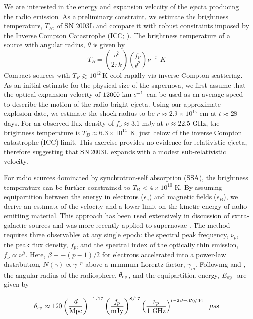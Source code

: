 \documentclass[12pt,preprint]{aastex}
\begin{document}
We are interested in the energy and expansion velocity of the ejecta
producing the radio emission.  As a preliminary constraint, we
estimate the brightness temperature, $T_B$, of SN 2003L and compare it
with robust constraints imposed by the Inverse Compton Catastrophe
(ICC; \citealt{kp81}).  The brightness temperature of a source with
angular radius, $\theta$ is given by
%
\begin{equation}
T_B = \left( \frac{c^2}{2\pi k}\right) \left( \frac {f_{\nu}}{\theta^2}\right) \nu^{-2}~~K
\end{equation}
%
Compact sources with $T_B \gtrsim 10^{12}\,$K cool rapidly via inverse
Compton scattering.  As an initial estimate for the physical size of
the supernova, we first assume that the optical expansion velocity of
$12000\rm ~km~s^{-1}$ \citep{mck+03} can be used as an average speed
to describe the motion of the radio bright ejecta.  Using our
approximate explosion date, we estimate the shock radius to be
$r\approx2.9\times 10^{15}$ cm at $t\approx 28$ days. For an observed
flux density of $f_{\nu}\approx 3.1$ mJy at $\nu \approx 22.5$ GHz,
the brightness temperature is $T_B\approx 6.3\times 10^{11}$ K, just
below of the inverse Compton catastrophe (ICC) limit.  This exercise
provides no evidence for relativistic ejecta, therefore suggesting
that SN\,2003L expands with a modest sub-relativistic velocity.

For radio sources dominated by synchrotron-self absorption (SSA), the
brightness temperature can be further constrained to $T_B < 4\times
10^{10}$ K. By assuming equipartition between the energy in electrons
($\epsilon_e$) and magnetic fields ($\epsilon_B$), we derive an
estimate of the velocity and a lower limit on the kinetic energy of
radio emitting material. This approach has been used extensively in
discussion of extra-galactic sources and was more recently applied to
supernovae \citep{c98,kfw+98}.  The method requires three observables
at any single epoch: the spectral peak frequency, $\nu_p$, the peak
flux density, $f_p$, and the spectral index of the optically thin
emission, $f_{\nu}\propto \nu^{\beta}$.  Here, $\beta\equiv -(p-1)/2$
for electrons accelerated into a power-law distribution,
$N(\gamma)\propto \gamma^{-p}$ above a minimum Lorentz factor,
$\gamma_m$.  Following \citet{kfw+98} and \citet{bkc02}, the angular
radius of the radiosphere, $\theta_{\rm ep}$, and the equipartition
energy, $E_{\rm ep}$, are given by

\begin{equation}
\theta_{\rm ep}\approx 120 \left(\frac{d}{\rm Mpc}\right)^{-1/17} \left(\frac{f_p}{\rm mJy}\right)^{8/17} \left(\frac{\nu_p}{\rm 1~GHz}\right)^{(-2\beta-35)/34}~~\rm \mu as 
\label{eqn:theta_ep}
\end{equation}
\end{document}
